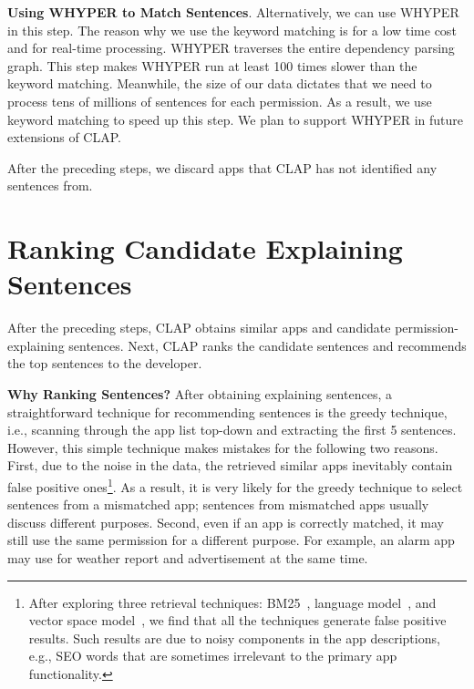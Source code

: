 \textbf{Using WHYPER to Match Sentences}. Alternatively, we can use WHYPER in this step. 
The reason why we use the keyword matching is for a low time cost and for real-time processing. 
WHYPER traverses the entire dependency parsing graph. 
This step makes WHYPER run at least 100 times slower than the keyword matching. 
Meanwhile, the size of our data dictates that we need to process tens of millions of sentences for each permission. 
As a result, we use keyword matching to speed up this step. We plan to support WHYPER in future extensions of CLAP.

After the preceding steps, we discard apps that CLAP has not identified any sentences from. 

\section{Ranking Candidate Explaining Sentences}
\label{sec:vote}

After the preceding steps, CLAP obtains similar apps and candidate permission-explaining sentences. 
Next, CLAP ranks the candidate sentences and recommends the top sentences to the developer. 

\textbf{Why Ranking Sentences?} After obtaining explaining sentences, a straightforward technique for recommending sentences is the greedy technique, i.e., scanning through the app list top-down and extracting the first 5 sentences. 
However, this simple technique makes mistakes for the following two reasons.  
First, due to the noise in the data, the retrieved similar apps inevitably contain false positive ones\footnote{After exploring three retrieval techniques: BM25~\cite{FT006}, language model~\cite{Zhai07noteson}, and vector space model~\cite{361220}, we find that all the techniques generate false positive results. 
Such results are due to noisy components in the app descriptions, e.g., SEO words that are sometimes irrelevant to the primary app functionality. }. 
As a result, it is very likely for the greedy technique to select sentences from a mismatched app; sentences from mismatched apps usually discuss different purposes. 
Second, even if an app is correctly matched, it may still use the same permission for a different purpose. 
For example, an alarm app may use  for weather report and advertisement at the same time. 


